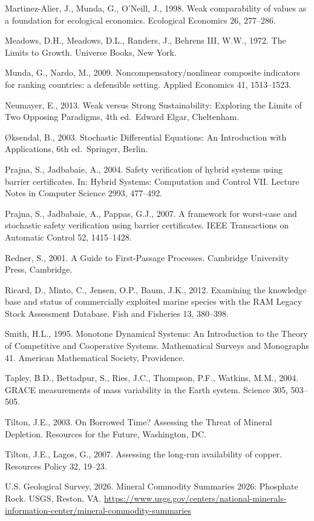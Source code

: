 \documentclass[11pt]{article}
\begin{document}
Martinez-Alier, J., Munda, G., O'Neill, J., 1998. Weak comparability of
values as a foundation for ecological economics. Ecological Economics
26, 277--286.

Meadows, D.H., Meadows, D.L., Randers, J., Behrens III, W.W., 1972. The
Limits to Growth. Universe Books, New York.

Munda, G., Nardo, M., 2009. Noncompensatory/\allowbreak{}nonlinear composite
indicators for ranking countries: a defensible setting. Applied
Economics 41, 1513--1523.

Neumayer, E., 2013. Weak versus Strong Sustainability: Exploring the
Limits of Two Opposing Paradigms, 4th ed.~Edward Elgar, Cheltenham.

\O{}ksendal, B., 2003. Stochastic Differential Equations: An Introduction
with Applications, 6th ed.~Springer, Berlin.

Prajna, S., Jadbabaie, A., 2004. Safety verification of hybrid systems using barrier certificates. In: Hybrid Systems: Computation and Control VII. Lecture Notes in Computer Science 2993, 477--492.

Prajna, S., Jadbabaie, A., Pappas, G.J., 2007. A framework for worst-case and stochastic safety verification using barrier certificates. IEEE Transactions on Automatic Control 52, 1415--1428.

Redner, S., 2001. A Guide to First-Passage Processes. Cambridge
University Press, Cambridge.

Ricard, D., Minto, C., Jensen, O.P., Baum, J.K., 2012. Examining the
knowledge base and status of commercially exploited marine species with
the RAM Legacy Stock Assessment Database. Fish and Fisheries 13,
380--398.

Smith, H.L., 1995. Monotone Dynamical Systems: An Introduction to the Theory of Competitive and Cooperative Systems. Mathematical Surveys and Monographs 41. American Mathematical Society, Providence.

Tapley, B.D., Bettadpur, S., Ries, J.C., Thompson, P.F., Watkins, M.M.,
2004. GRACE measurements of mass variability in the Earth system.
Science 305, 503--505.

Tilton, J.E., 2003. On Borrowed Time? Assessing the Threat of Mineral
Depletion. Resources for the Future, Washington, DC.

Tilton, J.E., Lagos, G., 2007. Assessing the long-run availability of
copper. Resources Policy 32, 19--23.

U.S. Geological Survey, 2026. Mineral Commodity Summaries 2026:
Phosphate Rock. USGS, Reston, VA.
\url{https://www.usgs.gov/centers/national-minerals-information-center/mineral-commodity-summaries}
\end{document}
